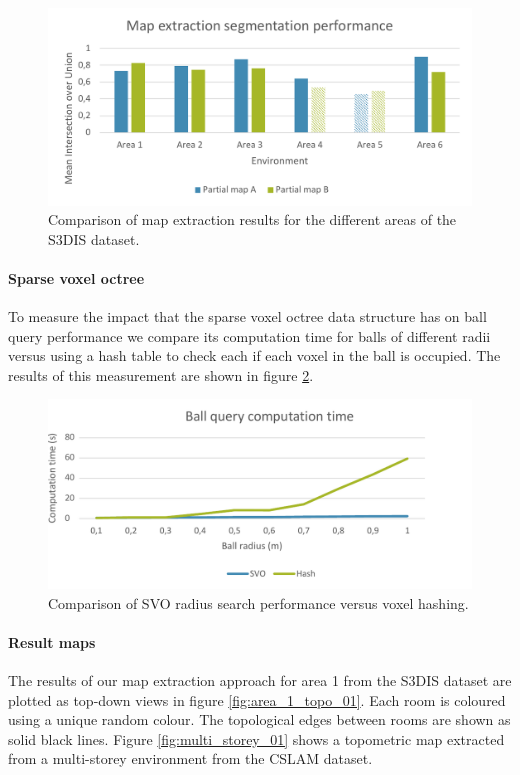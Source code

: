 \begin{figure}[h]
    \centering
    \includegraphics*[width=\textwidth]{./fig/map_extract_chart.pdf}
    \caption{Comparison of map extraction results for the different areas of the S3DIS dataset.}
    \label{fig:map_extract_perf}
\end{figure}

\paragraph{Sparse voxel octree}
To measure the impact that the sparse voxel octree data structure has on ball query performance we compare its computation time for balls of different radii versus using a hash table to check each if each voxel in the ball is occupied. The results of this measurement are shown in figure \ref{fig:svo_perf}.

\begin{figure}[h]
    \centering
    \includegraphics*[width=\textwidth]{./fig/svo_chart.pdf}
    \caption{Comparison of SVO radius search performance versus voxel hashing.}
    \label{fig:svo_perf}
\end{figure}

\paragraph{Result maps}
The results of our map extraction approach for area 1 from the S3DIS dataset are plotted as top-down views in figure \ref{fig:area_1_topo_01}. Each room is coloured using a unique random colour. The topological edges between rooms are shown as solid black lines. Figure \ref{fig:multi_storey_01} shows a topometric map extracted from a multi-storey environment from the CSLAM dataset.

